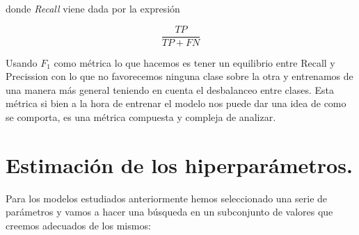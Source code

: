 \documentclass[11pt]{article}
\begin{document}
donde \textit{Recall} viene dada por la expresión

\[
    \frac{TP}{TP+FN}
\]

Usando $F_1$ como métrica lo que hacemos es tener un equilibrio entre Recall y
Precission con lo que no favorecemos ninguna clase sobre la otra y entrenamos de
una manera más general teniendo en cuenta el desbalanceo entre clases. Esta
métrica si bien a la hora de entrenar el modelo nos puede dar una idea 
de como se comporta, es una métrica compuesta y compleja de analizar.

\section{Estimación de los hiperparámetros.}


Para los modelos estudiados anteriormente hemos seleccionado una serie de
parámetros y vamos a hacer una búsqueda en un subconjunto de valores que creemos
adecuados de los mismos:
\end{document}
